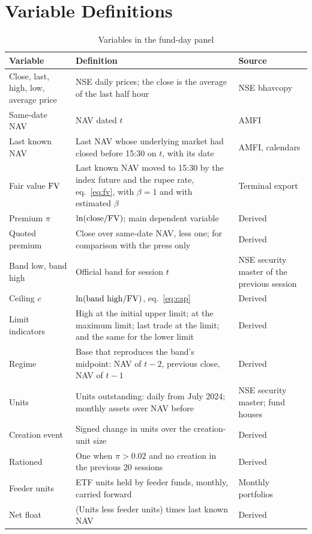 \section{Variable Definitions}\label{app:variables}
\begin{table}[!t]
\centering\footnotesize
\caption{Variables in the fund-day panel}\label{tab:variables}
\begin{tabularx}{\textwidth}{L{3.2cm}YL{3.4cm}}
\toprule
Variable & Definition & Source\\
\midrule
Close, last, high, low, average price & NSE daily prices; the close is the average of the last half hour & NSE bhavcopy\\
Same-date NAV & NAV dated $t$ & AMFI\\
Last known NAV & Last NAV whose underlying market had closed before 15:30 on $t$, with its date & AMFI, calendars\\
Fair value $\mathrm{FV}$ & Last known NAV moved to 15:30 by the index future and the rupee rate, eq.~\eqref{eq:fv}, with $\beta=1$ and with estimated $\beta$ & Terminal export\\
Premium $\pi$ & $\ln(\text{close}/\mathrm{FV})$; main dependent variable & Derived\\
Quoted premium & Close over same-date NAV, less one; for comparison with the press only & Derived\\
Band low, band high & Official band for session $t$ & NSE security master of the previous session\\
Ceiling $c$ & $\ln(\text{band high}/\mathrm{FV})$, eq.~\eqref{eq:cap} & Derived\\
Limit indicators & High at the initial upper limit; at the maximum limit; last trade at the limit; and the same for the lower limit & Derived\\
Regime & Base that reproduces the band's midpoint: NAV of $t-2$, previous close, NAV of $t-1$ & Derived\\
Units & Units outstanding: daily from July 2024; monthly assets over NAV before & NSE security master; fund houses\\
Creation event & Signed change in units over the creation-unit size & Derived\\
Rationed & One when $\pi>0.02$ and no creation in the previous 20 sessions & Derived\\
Feeder units & ETF units held by feeder funds, monthly, carried forward & Monthly portfolios\\
Net float & (Units less feeder units) times last known NAV & Derived\\

\end{tabularx}
\end{table}
